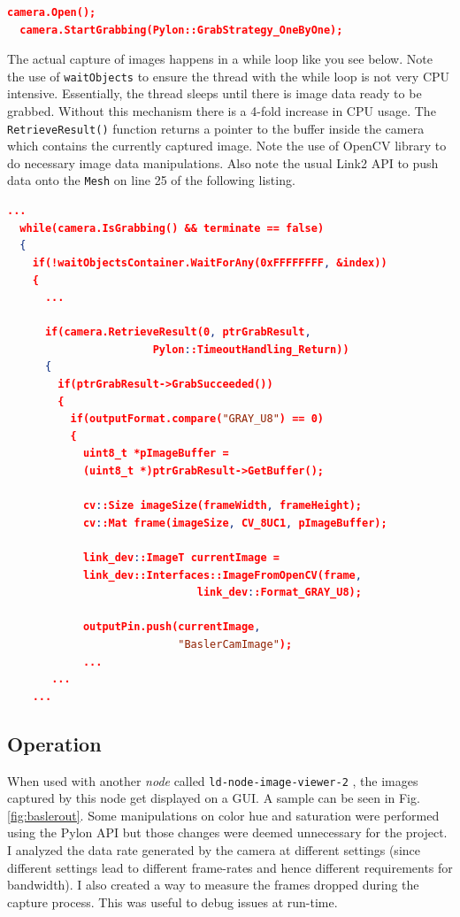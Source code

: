 \documentclass[a4paper, 12pt, oneside]{report}
\begin{document}
  \begin{lstlisting}[language=json,firstnumber=1]
  camera.Open();
  camera.StartGrabbing(Pylon::GrabStrategy_OneByOne);   
  \end{lstlisting}
  
  The actual capture of images happens in a while loop like you see below. Note the use of \texttt{waitObjects} to ensure the thread with the while loop is not very CPU intensive. Essentially, the thread sleeps until there is image data ready to be grabbed. Without this mechanism there is a 4-fold increase in CPU usage. The \texttt{RetrieveResult()} function returns a pointer to the buffer inside the camera which contains the currently captured image. Note the use of OpenCV \cite{OpenCVAPIReferenceOpenCV24137documentation-2020-02-17} library to do necessary image data manipulations. Also note the usual Link2 API to push data onto the \texttt{Mesh} on line 25 of the following listing.
  
  \begin{lstlisting}[language=json,firstnumber=1]
  ...
  while(camera.IsGrabbing() && terminate == false)
  {
    if(!waitObjectsContainer.WaitForAny(0xFFFFFFFF, &index))
    {
      ...
      
      if(camera.RetrieveResult(0, ptrGrabResult, 
                       Pylon::TimeoutHandling_Return)) 
      {
        if(ptrGrabResult->GrabSucceeded())
        {
          if(outputFormat.compare("GRAY_U8") == 0)
          {
            uint8_t *pImageBuffer = 
            (uint8_t *)ptrGrabResult->GetBuffer();
            
            cv::Size imageSize(frameWidth, frameHeight);
            cv::Mat frame(imageSize, CV_8UC1, pImageBuffer);
            
            link_dev::ImageT currentImage =
            link_dev::Interfaces::ImageFromOpenCV(frame, 
                              link_dev::Format_GRAY_U8);   
            
            outputPin.push(currentImage, 
                           "BaslerCamImage");
            ...
       ...
    ...        
  \end{lstlisting}
    
  \subsection{Operation}
  
  When used with another \textit{node} called \texttt{ld-node-image-viewer-2} \cite{Image2DViewerLinkDevelopersRFC-2020-01-16}, the images captured by this node get displayed on a GUI. A sample can be seen in Fig. \ref{fig:baslerout}. Some manipulations on color hue and saturation were performed using the Pylon API but those changes were deemed unnecessary for the project. I analyzed the data rate generated by the camera at different settings (since different settings lead to different frame-rates and hence different requirements for bandwidth). I also created a way to measure the frames dropped during the capture process. This was useful to debug issues at run-time.  
  
\end{document}

